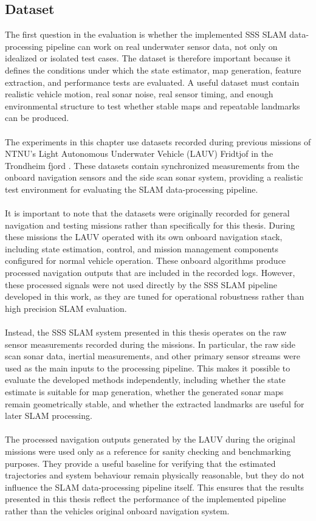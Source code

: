 \subsection{Dataset}
The first question in the evaluation is whether the implemented SSS SLAM data-processing pipeline can work on real underwater sensor data, not only on idealized or isolated test cases. The dataset is therefore important because it defines the conditions under which the state estimator, map generation, feature extraction, and performance tests are evaluated. A useful dataset must contain realistic vehicle motion, real sonar noise, real sensor timing, and enough environmental structure to test whether stable maps and repeatable landmarks can be produced.
\\ \\
The experiments in this chapter use datasets recorded during previous missions of NTNU's Light Autonomous Underwater Vehicle (LAUV) Fridtjof in the Trondheim fjord \cite{LAUV_Fridtjof}. These datasets contain synchronized measurements from the onboard navigation sensors and the side scan sonar system, providing a realistic test environment for evaluating the SLAM data-processing pipeline.
\\ \\
It is important to note that the datasets were originally recorded for general navigation and testing missions rather than specifically for this thesis. During these missions the LAUV operated with its own onboard navigation stack, including state estimation, control, and mission management components configured for normal vehicle operation. These onboard algorithms produce processed navigation outputs that are included in the recorded logs. However, these processed signals were not used directly by the SSS SLAM pipeline developed in this work, as they are tuned for operational robustness rather than high precision SLAM evaluation.
\\ \\
Instead, the SSS SLAM system presented in this thesis operates on the raw sensor measurements recorded during the missions. In particular, the raw side scan sonar data, inertial measurements, and other primary sensor streams were used as the main inputs to the processing pipeline. This makes it possible to evaluate the developed methods independently, including whether the state estimate is suitable for map generation, whether the generated sonar maps remain geometrically stable, and whether the extracted landmarks are useful for later SLAM processing.
\\ \\
The processed navigation outputs generated by the LAUV during the original missions were used only as a reference for sanity checking and benchmarking purposes. They provide a useful baseline for verifying that the estimated trajectories and system behaviour remain physically reasonable, but they do not influence the SLAM data-processing pipeline itself. This ensures that the results presented in this thesis reflect the performance of the implemented pipeline rather than the vehicles original onboard navigation system.
